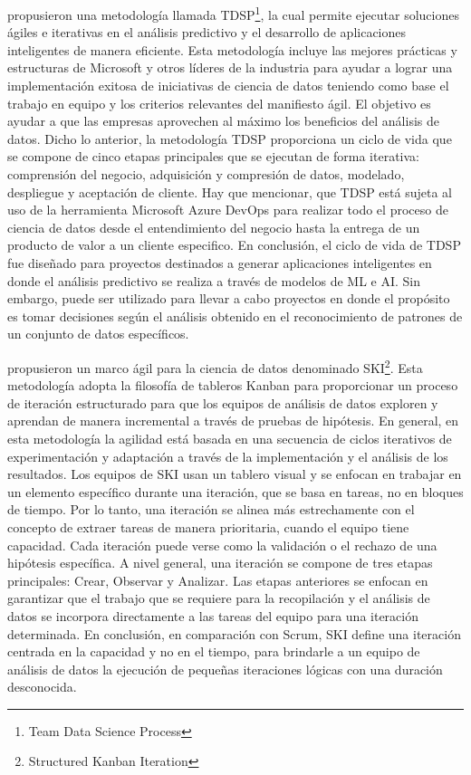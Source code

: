 \cite{Microsoft2022} propusieron una metodología llamada TDSP\footnote{Team Data Science Process}, la cual permite ejecutar soluciones ágiles e iterativas en el análisis predictivo y el desarrollo de aplicaciones inteligentes de manera eficiente. Esta metodología incluye las mejores prácticas y estructuras de Microsoft y otros líderes de la industria para ayudar a lograr una implementación exitosa de iniciativas de ciencia de datos teniendo como base el trabajo en equipo y los criterios relevantes del manifiesto ágil. El objetivo es ayudar a que las empresas aprovechen al máximo los beneficios del análisis de datos. Dicho lo anterior, la metodología TDSP proporciona un ciclo de vida que se compone de cinco etapas principales que se ejecutan de forma iterativa: comprensión del negocio, adquisición y compresión de datos, modelado, despliegue y aceptación de cliente. Hay que mencionar, que TDSP está sujeta al uso de la herramienta Microsoft Azure DevOps para realizar todo el proceso de ciencia de datos desde el entendimiento del negocio hasta la entrega de un producto de valor a un cliente especifico. En conclusión, el ciclo de vida de TDSP fue diseñado para proyectos destinados a generar aplicaciones inteligentes en donde el análisis predictivo se realiza a través de modelos de ML e AI. Sin embargo, puede ser utilizado para llevar a cabo proyectos en donde el propósito es tomar decisiones según el análisis obtenido en el reconocimiento de patrones de un conjunto de datos específicos.

\cite{Saltz2019} propusieron un marco ágil para la ciencia de datos denominado SKI\footnote{Structured Kanban Iteration}. Esta metodología adopta la filosofía de tableros Kanban para proporcionar un proceso de iteración estructurado para que los equipos de análisis de datos exploren y aprendan de manera incremental a través de pruebas de hipótesis. En general, en esta metodología la agilidad está basada en una secuencia de ciclos iterativos de experimentación y adaptación a través de la implementación y el análisis de los resultados. Los equipos de SKI usan un tablero visual y se enfocan en trabajar en un elemento específico durante una iteración, que se basa en tareas, no en bloques de tiempo. Por lo tanto, una iteración se alinea más estrechamente con el concepto de extraer tareas de manera prioritaria, cuando el equipo tiene capacidad. Cada iteración puede verse como la validación o el rechazo de una hipótesis específica. A nivel general, una iteración se compone de tres etapas principales: Crear, Observar y Analizar. Las etapas anteriores se enfocan en garantizar que el trabajo que se requiere para la recopilación y el análisis de datos se incorpora directamente a las tareas del equipo para una iteración determinada. En conclusión, en comparación con Scrum, SKI define una iteración centrada en la capacidad y no en el tiempo, para brindarle a un equipo de análisis de datos la ejecución de pequeñas iteraciones lógicas con una duración desconocida.

